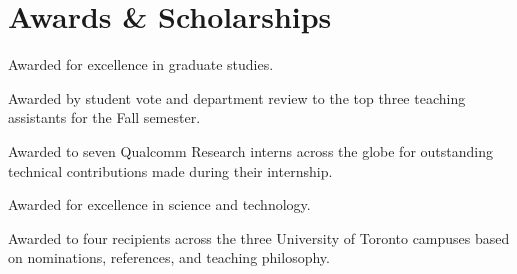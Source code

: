 \section{\sc Awards \& Scholarships}

{
  Awarded for excellence in graduate studies.
}

{
  Awarded by student vote and department review to the top three teaching assistants for the Fall semester.
}

{
  Awarded to seven Qualcomm Research interns across the globe for outstanding technical contributions made during their internship.
}

{
  Awarded for excellence in science and technology.
}

{
  Awarded to four recipients across the three University of Toronto campuses based on nominations, references, and teaching philosophy.
}
